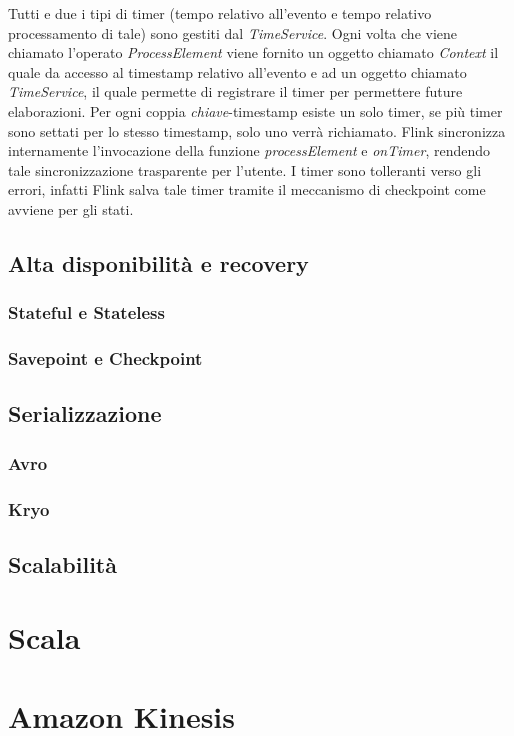 \label{sec:timer}
Tutti e due i tipi di timer (tempo relativo all'evento e tempo relativo processamento di tale) sono gestiti dal \textit{TimeService}. Ogni volta che viene chiamato l'operato \textit{ProcessElement} viene fornito un oggetto chiamato \textit{Context} il quale da accesso al \gls{timestamp} relativo all'evento e ad un oggetto chiamato \textit{TimeService}, il quale permette di registrare il timer per permettere future elaborazioni. Per ogni coppia \textit{chiave}-\gls{timestamp} esiste un solo timer, se più timer sono settati per lo stesso \gls{timestamp}, solo uno verrà richiamato. Flink sincronizza internamente l'invocazione della funzione \textit{processElement} e \textit{onTimer}, rendendo tale sincronizzazione trasparente per l'utente. I timer sono tolleranti verso gli errori, infatti Flink salva tale timer tramite il meccanismo di \gls{checkpoint} come avviene per gli stati.

\subsection{Alta disponibilità e recovery}

\subsubsection{Stateful e Stateless}

\subsubsection{Savepoint e Checkpoint}

\subsection{Serializzazione}

\subsubsection{Avro}

\subsubsection{Kryo}


\subsection{Scalabilità}


\section{Scala}

\section{Amazon Kinesis}

